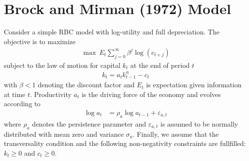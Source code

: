 \documentclass{article}
\begin{document}
\newpage

\section[Brock and Mirman (1972) Model]{Brock and Mirman (1972) Model\label{ex:BrockMirman}}
Consider a simple RBC model with log-utility and full depreciation.
The objective is to maximize
\begin{align*}
\max ~E_t \sum_{j=0}^{\infty} \beta^{j} \log(c_{t+j})
\end{align*}
subject to the law of motion for capital $k_t$ at the end of period $t$
\begin{align}
k_{t} = a_t k_{t-1}^\alpha - c_t \label{eq:BrockMirmanCapital}
\end{align}
with $\beta <1$ denoting the discount factor and $E_t$ is expectation given information at time $t$.
Productivity $a_t$ is the driving force of the economy and evolves according to
\begin{align}
\log{a_{t}} &= \rho_a \log{a_{t-1}}  + \varepsilon_{a,t} \label{eq:BrockMirmanTFP}
\end{align}
where $\rho_a$ denotes the persistence parameter
  and $\varepsilon_{a,t}$ is assumed to be normally distributed with mean zero and variance $\sigma_a$.
Finally, we assume that the transversality condition and 
  the following non-negativity constraints are fullfilled: $k_t \geq0$ and $c_t \geq 0$.
\end{document}
